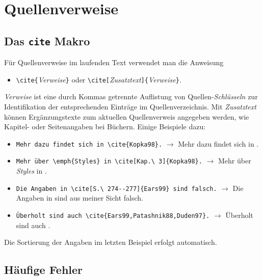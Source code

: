 \section{Quellenverweise}

\subsection{Das {\tt {\bs}cite} Makro}

Für Quellenverweise im laufenden Text verwendet man die Anweisung
\begin{itemize}
\item[] \verb!\cite{!\textit{Verweise}\verb!}! 
				\quad oder \quad
        \verb!\cite[!\textit{Zusatztext}\verb!]{!\textit{Verweise}\verb!}!.
\end{itemize}

\noindent%
\textit{Verweise} ist eine durch Kommas getrennte Auflistung von Quellen-\emph{Schlüsseln}
zur Identifikation der entsprechenden Einträge im Quellenverzeichnis.
Mit \textit{Zusatztext} können Ergänzungstexte zum aktuellen Quellenverweis angegeben
werden, wie \zB Kapitel- oder Seitenangaben bei Büchern.
Einige Beispiele dazu:
\begin{itemize}
\item[] \verb!Mehr dazu findet sich in \cite{Kopka98}.! \newline
      $\rightarrow$ Mehr dazu findet sich in \cite{Kopka98}.
\item[] \verb!Mehr über \emph{Styles} in \cite[Kap.\ 3]{Kopka98}.! \newline
      $\rightarrow$ Mehr über \emph{Styles} in \cite[Kap.\ 3]{Kopka98}.
\item[] \verb!Die Angaben in \cite[S.\ 274--277]{Ears99} sind falsch.! \newline
      $\rightarrow$ Die Angaben in \cite[S.\ 274--277]{Ears99} sind aus meiner Sicht falsch.
\item[] \verb!Überholt sind auch \cite{Ears99,Patashnik88,Duden97}.! \newline
      $\rightarrow$ Überholt sind auch \cite{Ears99,Patashnik88,Duden97}.
\end{itemize}
Die Sortierung der Angaben im letzten Beispiel erfolgt automatisch.



\subsection{Häufige Fehler}

